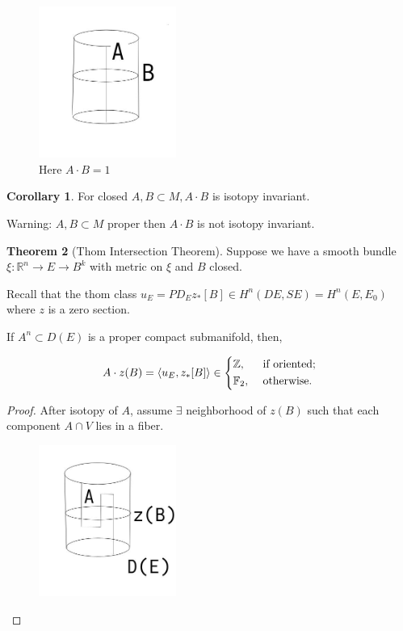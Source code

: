 \documentclass{article}
\theoremstyle{definition}
\newtheorem{theorem}{Theorem}
\newtheorem{corollary}[theorem]{Corollary}
\begin{document}
    \begin{figure}[H]
        \centering
        \includegraphics[width=0.4\textwidth]{img/cylinder}
        \caption{Here \(A \cdot B = 1\)}
    \end{figure}

    \begin{corollary}
        For closed \(A, B \subset M, A \cdot B\) is isotopy invariant.

        Warning: \(A, B \subset M\) proper then \(A \cdot B\) is not isotopy invariant.
    \end{corollary}

    \begin{theorem}
        [Thom Intersection Theorem] Suppose we have a smooth bundle \(\xi: \mathbb{R}^n \to E \to B^k\) with metric on \(\xi\) and \(B\) closed.

        Recall that the thom class \(u_E = PD_E z_{\ast}[B] \in H^n(DE, SE) = H^n(E, E_0)\) where \(z\) is a zero section.
        
        If \(A^n \subset D(E)\) is a proper compact submanifold, then,

        \[
            A \cdot z(B) = \langle u_E , z_{\ast} [B] \rangle \in \begin{dcases}
                \mathbb{Z}, &\text{ if oriented}  ;\\
                \mathbb{F}_2, &\text{ otherwise}.
            \end{dcases}
        \]
    \end{theorem}
    
    \begin{proof}
        After isotopy of \(A\),  assume \(\exists\) neighborhood of \(z(B)\) such that each component \(A \cap V\) lies in a fiber.

        \begin{figure}[H]
            \centering
            \includegraphics[width=0.4\textwidth]{img/thomintersection}
        \end{figure}
    \end{proof}
\end{document}
